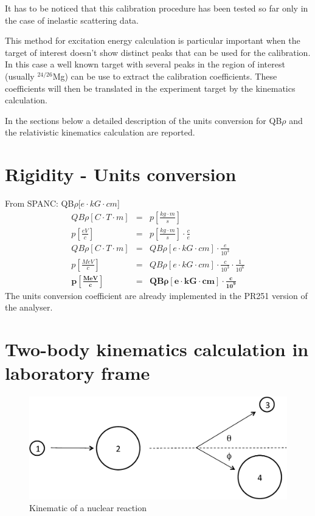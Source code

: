 \documentclass[]{report}
\begin{document}
It has to be noticed that this calibration procedure has been tested so far only in the case of inelastic scattering data. \par
This method for excitation energy calculation is particular important when the target of interest doesn't show distinct peaks that can be used for the calibration. In this case a well known target with several peaks in the region of interest (usually $^{24/26}$Mg) can be use to extract the calibration coefficients. These coefficients will then be translated in the experiment target by the kinematics calculation.\par
In the sections below a detailed description of the units conversion for QB$\rho$ and the relativistic kinematics calculation are reported.

\section{Rigidity - Units conversion}

From SPANC: QB$\rho$[$e\cdot kG\cdot cm$]\\
\begin{eqnarray}
QB\rho[C\cdot T\cdot m] &=& p[\frac{kg\cdot m}{s}] \nonumber\\
p[\frac{eV}{c}] &=& p[\frac{kg\cdot m}{s}]\cdot\frac{c}{e}\nonumber\\
QB\rho[C\cdot T\cdot m] &=& QB\rho[e\cdot kG\cdot cm]\cdot\frac{e}{10^3}\nonumber\\
p[\frac{MeV}{c}] &=& QB\rho[e\cdot kG\cdot cm]\cdot\frac{c}{10^3}\cdot\frac{1}{10^6} \nonumber\\
\mathbf{p[\frac{MeV}{c}]} &\mathbf{=}& \mathbf{QB\rho[e\cdot kG\cdot cm]\cdot\frac{c}{10^9}}
\end{eqnarray}
The units conversion coefficient are already implemented in the PR251 version of the analyser. 

\section{Two-body kinematics calculation in laboratory frame}

\begin{figure}
	\includegraphics[width=\linewidth]{Figure/scattering.pdf}
	\caption{Kinematic of a nuclear reaction}
	\label{fig:scattering}
\end{figure}
\end{document}
